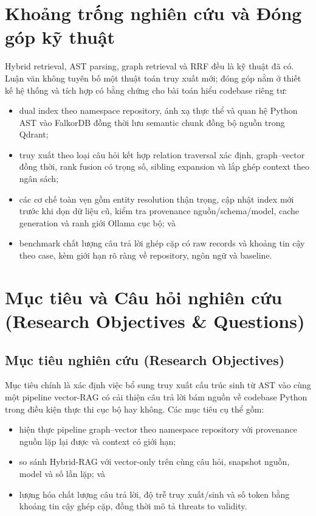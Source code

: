 \documentclass[12pt,a4paper,oneside]{report}
\begin{document}
\section{Khoảng trống nghiên cứu và Đóng góp kỹ thuật}
Hybrid retrieval, AST parsing, graph retrieval và RRF đều là kỹ thuật đã có. Luận văn không tuyên bố một thuật toán truy xuất mới; đóng góp nằm ở thiết kế hệ thống và tích hợp có bằng chứng cho bài toán hiểu codebase riêng tư:
\begin{itemize}
    \item dual index theo namespace repository, ánh xạ thực thể và quan hệ Python AST vào FalkorDB đồng thời lưu semantic chunk đồng bộ nguồn trong Qdrant;
    \item truy xuất theo loại câu hỏi kết hợp relation traversal xác định, graph--vector đồng thời, rank fusion có trọng số, sibling expansion và lắp ghép context theo ngân sách;
    \item các cơ chế toàn vẹn gồm entity resolution thận trọng, cập nhật index mới trước khi dọn dữ liệu cũ, kiểm tra provenance nguồn/schema/model, cache generation và ranh giới Ollama cục bộ; và
    \item benchmark chất lượng câu trả lời ghép cặp có raw records và khoảng tin cậy theo case, kèm giới hạn rõ ràng về repository, ngôn ngữ và baseline.
\end{itemize}

\section{Mục tiêu và Câu hỏi nghiên cứu (Research Objectives \& Questions)}

\subsection{Mục tiêu nghiên cứu (Research Objectives)}
Mục tiêu chính là xác định việc bổ sung truy xuất cấu trúc sinh từ AST vào cùng một pipeline vector-RAG có cải thiện câu trả lời bám nguồn về codebase Python trong điều kiện thực thi cục bộ hay không. Các mục tiêu cụ thể gồm:
\begin{itemize}
    \item hiện thực pipeline graph--vector theo namespace repository với provenance nguồn lặp lại được và context có giới hạn;
    \item so sánh Hybrid-RAG với vector-only trên cùng câu hỏi, snapshot nguồn, model và số lần lặp; và
    \item lượng hóa chất lượng câu trả lời, độ trễ truy xuất/sinh và số token bằng khoảng tin cậy ghép cặp, đồng thời mô tả threats to validity.
\end{itemize}
\end{document}
